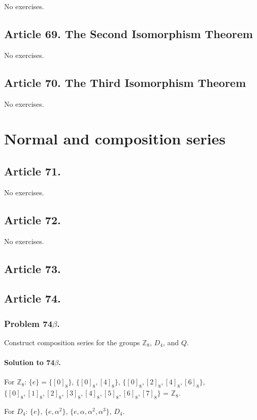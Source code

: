 No exercises.

\subsection{Article 69. The Second Isomorphism Theorem}

No exercises.

\subsection{Article 70. The Third Isomorphism Theorem}

No exercises.


\section{Normal and composition series}


\subsection{Article 71.}

No exercises.
\subsection{Article 72.}

No exercises.
\subsection{Article 73.}

\subsection{Article 74.}

\subsubsection{Problem 74$\beta$.}
Construct composition series for the groups $\mathbb{Z}_8$, $D_4$, and $Q$.

\paragraph*{Solution to 74$\beta$.}
For $\mathbb{Z}_8$: $\{e\} = \{[0]_8\}$, $\{[0]_8, [4]_8\}$, $\{[0]_8, [2]_8, [4]_8, [6]_8\}$,
$\{[0]_8, [1]_8, [2]_8, [3]_8, [4]_8, [5]_8, [6]_8, [7]_8\}$ = $\mathbb{Z}_8$.

For $D_4$: $\{e\}$, $\{e, \alpha^2\}$, $\{e, \alpha, \alpha^2, \alpha^3\}$, $D_4$.

